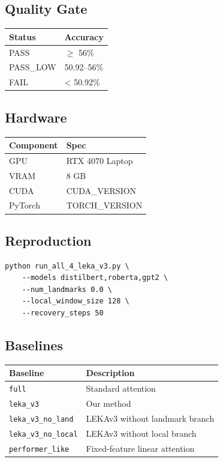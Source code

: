 \subsection{Quality Gate}

\begin{table}[H]
\centering
\small
\begin{tabular}{ll}
\toprule
\textbf{Status} & \textbf{Accuracy} \\
\midrule
PASS & $\ge$ 56\% \\
PASS\_LOW & 50.92--56\% \\
FAIL & < 50.92\% \\
\bottomrule
\end{tabular}
\end{table}

\subsection{Hardware}

\begin{table}[H]
\centering
\small
\begin{tabular}{ll}
\toprule
\textbf{Component} & \textbf{Spec} \\
\midrule
GPU & RTX 4070 Laptop \\
VRAM & 8 GB \\
CUDA & {{CUDA\_VERSION}} \\
PyTorch & {{TORCH\_VERSION}} \\
\bottomrule
\end{tabular}
\end{table}

\subsection{Reproduction}

\begin{lstlisting}
python run_all_4_leka_v3.py \
    --models distilbert,roberta,gpt2 \
    --num_landmarks 0.0 \
    --local_window_size 128 \
    --recovery_steps 50
\end{lstlisting}

\subsection{Baselines}

\begin{table}[H]
\centering
\small
\begin{tabular}{ll}
\toprule
\textbf{Baseline} & \textbf{Description} \\
\midrule
\texttt{full} & Standard attention \\
\texttt{leka\_v3} & Our method \\
\texttt{leka\_v3\_no\_land} & LEKAv3 without landmark branch \\
\texttt{leka\_v3\_no\_local} & LEKAv3 without local branch \\
\texttt{performer\_like} & Fixed-feature linear attention \\
\bottomrule
\end{tabular}
\end{table}

